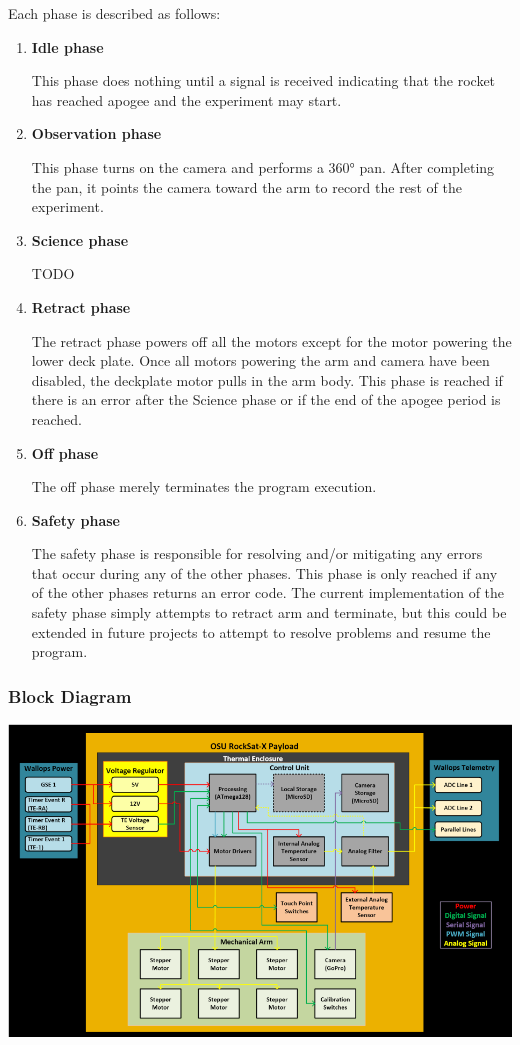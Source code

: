 Each phase is described as follows:
\begin{enumerate}
	\item{\textbf{Idle phase}}

	This phase does nothing until a signal is received indicating that the
	rocket has reached apogee and the experiment may start.

	\item{\textbf{Observation phase}}

	This phase turns on the camera and performs a 360° pan.
	After completing the pan, it points the camera toward the arm to record the
	rest of the experiment.

	\item{\textbf{Science phase}}

	TODO

	\item{\textbf{Retract phase}}

	The retract phase powers off all the motors except for the motor powering the lower deck plate. Once all motors powering the arm
	and camera have been disabled, the deckplate motor pulls in the arm body. This phase is reached if there is an error after the 
	Science phase or if the end of the apogee period is reached.

	\item{\textbf{Off phase}}

	The off phase merely terminates the program execution.

	\item{\textbf{Safety phase}}

	The safety phase is responsible for resolving and/or mitigating any errors
	that occur during any of the other phases.
	This phase is only reached if any of the other phases returns an error
	code.
	The current implementation of the safety phase simply attempts to retract
	arm and terminate, but this could be extended in future projects to attempt to resolve
	problems and resume the program.
\end{enumerate}

\subsubsection{Block Diagram}
\includegraphics[width=\textwidth]{./images/ProjectDocs/functionalBlockDiagram}

